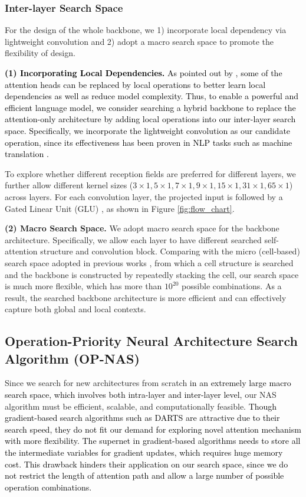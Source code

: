\documentclass[letterpaper]{article} \usepackage{aaai22}  \usepackage{times}  \usepackage{helvet}  \usepackage{courier}  \usepackage[hyphens]{url}  \usepackage{graphicx} \urlstyle{rm} \def\UrlFont{\rm}  \usepackage{natbib}  \usepackage{caption} \DeclareCaptionStyle{ruled}{labelfont=normalfont,labelsep=colon,strut=off} \frenchspacing  \setlength{\pdfpagewidth}{8.5in}  \setlength{\pdfpageheight}{11in}  \usepackage{algorithm}
\newcommand{\prj}[1]{\textcolor{black}{#1}} \newcommand{\prjj}[1]{\textcolor{black}{#1}} \newcommand{\jhh}[1]{\textcolor{black}{#1}} \newcommand{\jh}[1]{\textcolor{black}{#1}} \newcommand{\sh}[1]{\textcolor{black}{#1}} \usepackage{multirow}
\begin{document}
\subsubsection{Inter-layer Search Space}
For the design of the whole backbone, we 1) incorporate local dependency via lightweight convolution and 2) adopt a macro search space to promote the flexibility of design.

\prj{\textbf{(1) Incorporating Local Dependencies.} As pointed out by \citep{jiang2020convbert,wu2018pay}, some of the attention heads can be replaced by local operations to better learn local dependencies as well as reduce model complexity.}
\prj{Thus, to enable a powerful and efficient language model, we consider searching a hybrid backbone to replace the attention-only architecture by adding local operations into
our inter-layer search space. Specifically, we incorporate the lightweight convolution as our candidate operation, since its effectiveness has been proven in NLP tasks such as machine
translation \citep{wu2018pay}.}

To explore whether different reception fields are preferred for different
layers, we further allow different kernel sizes
($3\times1, 5\times1, 7\times1, 9\times1, 15\times1, 31\times1, 65\times1$)
across layers. For each convolution layer, the projected input
is followed by a Gated Linear Unit (GLU) \citep{dauphin2017language},
as shown in Figure \ref{fig:flow_chart}.
\noindent



\textbf{(2) Macro Search Space.} We adopt macro search space for the backbone architecture. Specifically, we allow each layer to have different searched self-attention structure and convolution block. Comparing with the micro (cell-based) search space adopted in previous works \citep{liu2018darts, shi2020bridging}, from which a cell structure is searched and the backbone is constructed by repeatedly stacking the cell, our search space is much more flexible, which has more than $10^{20}$ possible combinations. As a result, the searched backbone architecture is more efficient and can effectively capture both global and local contexts.


\subsection{
Operation-Priority Neural Architecture Search Algorithm\label{search_algor} (OP-NAS)
}



Since we search for new architectures from scratch \prj{in an extremely large macro search space, which involves both intra-layer and
inter-layer level,} 
our NAS algorithm must be efficient, scalable, and computationally feasible. \prjj{Though gradient-based search algorithms such as DARTS
are attractive due to their search speed, they do not fit our demand 
for exploring novel attention mechanism with more flexibility. 
The supernet in gradient-based algorithms needs to store all the intermediate variables for gradient updates, 
which requires huge memory cost.  This drawback hinders their application on our search space, since we do not restrict the length of attention path and allow a large number of possible operation combinations.
} 
\end{document}
